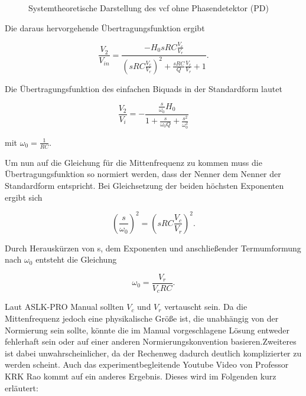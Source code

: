 \documentclass[../main.tex]{subfiles}
\begin{document}
\begin{figure}[!h]
  \centering
  \resizebox{1\textwidth}{!}{}
  \caption{Systemtheoretische Darstellung des \gls{vcf} ohne Phasendetektor (PD)}
  \label{fig:sb_sys_vcf}
\end{figure}


Die daraus hervorgehende Übertragungsfunktion ergibt

\begin{equation}
\frac{V_2}{V_{in}} = \frac{-H_0 sRC \frac{V_c}{V_r}}{\left(sRC\frac{V_c}{V_r}\right)^{2}+\frac{sRC}{Q}\frac{V_c}{V_r}+1}.
\end{equation}

Die Übertragungsfunktion des einfachen Biquads in der Standardform lautet

\begin{equation*}
\frac{V_2}{V_i} = -\frac{\frac{s}{\omega_0}H_0}{1 + \frac{s}{\omega_0 Q} + \frac{s^2}{\omega_0^2}}
\end{equation*}

mit $\omega_0 = \frac{1}{RC}$.

Um nun auf die Gleichung für die Mittenfrequenz zu kommen muss die Übertragungsfunktion so normiert werden, dass der Nenner dem Nenner der Standardform entspricht. Bei Gleichsetzung der beiden höchsten Exponenten ergibt sich

\begin{equation*}
\left(\frac{s}{\omega_0}\right)^{2} = \left(sRC\frac{V_c}{V_r}\right)^{2}.
\end{equation*}

Durch Herauskürzen von s, dem Exponenten und anschließender Termumformung nach $\omega_0$ entsteht die Gleichung

\begin{equation}
    \omega_0 = \frac{V_r}{V_cRC}.
    \label{eq:filtergrenzfrequenz}
\end{equation}

Laut ASLK-PRO Manual sollten $V_c$ und $V_r$ vertauscht sein. Da die Mittenfrequenz jedoch eine physikalische Größe ist, die unabhängig von der Normierung sein sollte, könnte die im Manual vorgeschlagene Lösung entweder fehlerhaft sein oder auf einer anderen Normierungskonvention basieren.Zweiteres ist dabei unwahrscheinlicher, da der Rechenweg dadurch deutlich komplizierter zu werden scheint. Auch das experimentbegleitende Youtube Video \cite{YT_stf_lab5} von Professor KRK Rao kommt auf ein anderes Ergebnis. Dieses wird im Folgenden kurz erläutert:\par
\medskip
\end{document}
